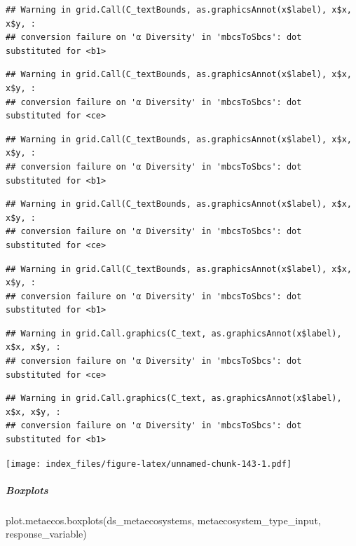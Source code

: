 \documentclass[
]{article}
\newenvironment{Shaded}{\begin{snugshade}}{\end{snugshade}}
\newcommand{\FunctionTok}[1]{\textcolor[rgb]{0.00,0.00,0.00}{#1}}
\newcommand{\NormalTok}[1]{#1}
\begin{document}
\begin{verbatim}
## Warning in grid.Call(C_textBounds, as.graphicsAnnot(x$label), x$x, x$y, :
## conversion failure on 'α Diversity' in 'mbcsToSbcs': dot substituted for <b1>
\end{verbatim}

\begin{verbatim}
## Warning in grid.Call(C_textBounds, as.graphicsAnnot(x$label), x$x, x$y, :
## conversion failure on 'α Diversity' in 'mbcsToSbcs': dot substituted for <ce>
\end{verbatim}

\begin{verbatim}
## Warning in grid.Call(C_textBounds, as.graphicsAnnot(x$label), x$x, x$y, :
## conversion failure on 'α Diversity' in 'mbcsToSbcs': dot substituted for <b1>
\end{verbatim}

\begin{verbatim}
## Warning in grid.Call(C_textBounds, as.graphicsAnnot(x$label), x$x, x$y, :
## conversion failure on 'α Diversity' in 'mbcsToSbcs': dot substituted for <ce>
\end{verbatim}

\begin{verbatim}
## Warning in grid.Call(C_textBounds, as.graphicsAnnot(x$label), x$x, x$y, :
## conversion failure on 'α Diversity' in 'mbcsToSbcs': dot substituted for <b1>
\end{verbatim}

\begin{verbatim}
## Warning in grid.Call.graphics(C_text, as.graphicsAnnot(x$label), x$x, x$y, :
## conversion failure on 'α Diversity' in 'mbcsToSbcs': dot substituted for <ce>
\end{verbatim}

\begin{verbatim}
## Warning in grid.Call.graphics(C_text, as.graphicsAnnot(x$label), x$x, x$y, :
## conversion failure on 'α Diversity' in 'mbcsToSbcs': dot substituted for <b1>
\end{verbatim}

\texttt{[image: index\_files/figure-latex/unnamed-chunk-143-1.pdf]}

\hypertarget{boxplots-1}{%
\subparagraph{Boxplots}\label{boxplots-1}}

\begin{Shaded}
\begin{Highlighting}[]
\FunctionTok{plot.metaecos.boxplots}\NormalTok{(ds\_metaecosystems, metaecosystem\_type\_input,}
\NormalTok{                       response\_variable)}
\end{Highlighting}
\end{Shaded}
\end{document}
